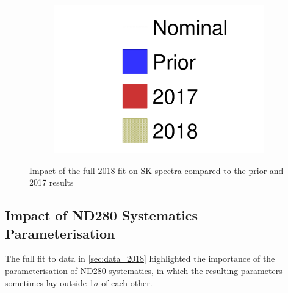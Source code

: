 \begin{figure}[h]
\begin{subfigure}[t]{0.32\textwidth}
		\includegraphics[width=\textwidth, trim={0mm 0mm 0mm 0mm}, clip, page=4]{figures/mach3/2018/data/prior_error_1june_try_2017_fit_on_sk_spectra_2018_results_test_spectra}
	\end{subfigure}
	
	\caption{Impact of the full 2018 fit on SK spectra compared to the prior and 2017 results}
	\label{fig:sk_2018}
\end{figure}

\subsection{Impact of ND280 Systematics Parameterisation}
The full fit to data in \autoref{sec:data_2018} highlighted the importance of the parameterisation of ND280 systematics, in which the resulting parameters sometimes lay outside 1$\sigma$ of each other. 

